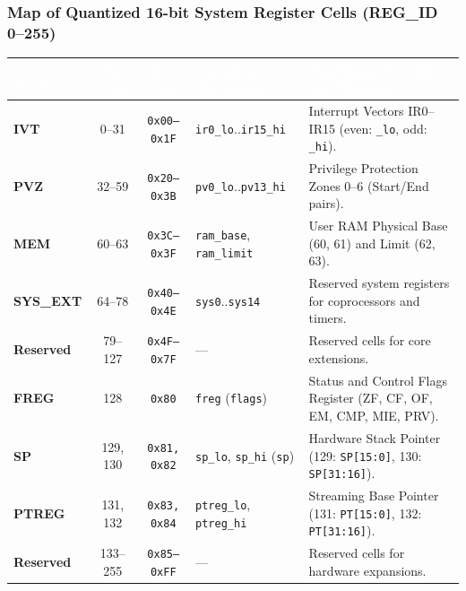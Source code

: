 \documentclass[11pt,a4paper]{article}
\begin{document}
\subsubsection*{Map of Quantized 16-bit System Register Cells (REG\_ID 0--255)}
\par\vspace{1mm}\noindent
\begin{minipage}{\textwidth}
\centering
\footnotesize
\begin{tabularx}{\textwidth}{@{} l c c l >{\raggedright\arraybackslash}X @{}}
\toprule
\rowcolor{limslate}
\textcolor{white}{\textbf{Group}} & \textcolor{white}{\textbf{Dec Cells}} & \textcolor{white}{\textbf{Hex Cells}} & \textcolor{white}{\textbf{Canonical Mnemonics}} & \textcolor{white}{\textbf{Functional Description and Mapping}} \\
\midrule
\rowcolors{2}{limroweven}{white}
\textbf{IVT} & 0--31 & \texttt{0x00--0x1F} & \texttt{ir0\_lo}..\texttt{ir15\_hi} & 16 Interrupt Vectors IR0--IR15 (even: \texttt{\_lo}, odd: \texttt{\_hi}). \\
\textbf{PVZ} & 32--59 & \texttt{0x20--0x3B} & \texttt{pv0\_lo}..\texttt{pv13\_hi} & 7 Privilege Protection Zones 0--6 (Start/End pairs). \\
\textbf{MEM} & 60--63 & \texttt{0x3C--0x3F} & \texttt{ram\_base}, \texttt{ram\_limit} & User RAM Physical Base (60, 61) and Limit (62, 63). \\
\textbf{SYS\_EXT} & 64--78 & \texttt{0x40--0x4E} & \texttt{sys0}..\texttt{sys14} & 15 Reserved system registers for coprocessors and timers. \\
\textbf{Reserved} & 79--127 & \texttt{0x4F--0x7F} & --- & 49 Reserved cells for core extensions. \\
\textbf{FREG} & 128 & \texttt{0x80} & \texttt{freg} (\texttt{flags}) & Status and Control Flags Register (ZF, CF, OF, EM, CMP, MIE, PRV). \\
\textbf{SP} & 129, 130 & \texttt{0x81, 0x82} & \texttt{sp\_lo}, \texttt{sp\_hi} (\texttt{sp}) & Hardware Stack Pointer (129: \texttt{SP[15:0]}, 130: \texttt{SP[31:16]}). \\
\textbf{PTREG} & 131, 132 & \texttt{0x83, 0x84} & \texttt{ptreg\_lo}, \texttt{ptreg\_hi} & Streaming Base Pointer (131: \texttt{PT[15:0]}, 132: \texttt{PT[31:16]}). \\
\textbf{Reserved} & 133--255 & \texttt{0x85--0xFF} & --- & 123 Reserved cells for hardware expansions. \\
\bottomrule
\end{tabularx}
\end{minipage}
\end{document}
